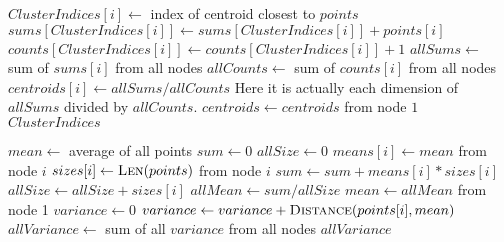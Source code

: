 \documentclass{article}
\begin{document}
\begin{algorithm}
\caption{}
\begin{algorithmic}[1]
				\State $ClusterIndices[i] \gets$ index of centroid closest to $points$
			\EndFor
				\State $sums[ClusterIndices[i]] \gets sums[ClusterIndices[i]] + points[i]$
				\State $counts[ClusterIndices[i]] \gets counts[ClusterIndices[i]] + 1$
			\EndFor
					\State $allSums \gets$ sum of $sums[i]$ from all nodes
					\State $allCounts \gets$ sum of $counts[i]$ from all nodes
					\State $centroids[i] \gets allSums / allCounts$ \Comment Here it is actually
					each dimension of $allSums$ divided by $allCounts$.
				\EndFor
			\EndIf
			\State $centroids \gets centroids$ from node $1$
		\EndWhile
		\State \Return $ClusterIndices$
	\EndFunction
\end{algorithmic}
\end{algorithm}

\begin{algorithm}
\caption{}
\begin{algorithmic}[1]
		\State $mean \gets$ average of all points
			\State $sum \gets 0$
			\State $allSize \gets 0$
				\State $means[i] \gets mean$ from node $i$
				\State $sizes[i] \gets \Call{Len}{points}$ from node $i$
				\State $sum \gets sum + means[i] * sizes[i]$
				\State $allSize \gets allSize + sizes[i]$
			\EndFor
			\State $allMean \gets sum / allSize$
		\EndIf
		\State $mean \gets allMean$ from node 1
		\State $variance \gets 0$
			\State $variance \gets variance + \Call{Distance}{points[i], mean}$
		\EndFor
		\State $allVariance \gets$ sum of all $variance$ from all nodes
		\State \Return $allVariance$
	\EndFunction
\end{algorithmic}
\end{algorithm}
\end{document}
